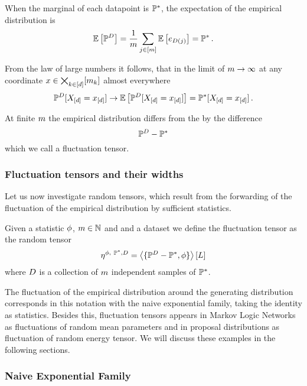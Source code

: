 When the marginal of each datapoint is $\mathbb{P}^*$, the expectation of the empirical distribution is
\begin{align*}
	\mathbb{E}\left[\mathbb{P}^{D}\right] 
	= \frac{1}{m} \sum_{j\in[m]}  \mathbb{E}\left[e_{D(j)}\right]
	= \mathbb{P}^* \, . 
\end{align*}

From the law of large numbers it follows, that in the limit of $m\rightarrow\infty$ at any coordinate $x\in\bigtimes_{k\in[d]}[m_{k}]$ almost everywhere
	\[ \mathbb{P}^{D}[X_{[d]}=x_{[d]}] \rightarrow \mathbb{E}\left[\mathbb{P}^{D}[X_{[d]}=x_{[d]}]\right] =  \mathbb{P}^*[X_{[d]}=x_{[d]}] \, . \]

At finite $m$ the empirical distribution differs from the by the difference
	\[ \mathbb{P}^{D} - \mathbb{P}^* \]
which we call a fluctuation tensor.


\subsubsection{Fluctuation tensors and their widths}

Let us now investigate random tensors, which result from the forwarding of the fluctuation of the empirical distribution by sufficient statistics.

\begin{definition}
	Given a statistic $\phi$, $m\in\mathbb{N}$ and and a dataset we define the fluctuation tensor as the random tensor
		\[ \expfamfluctuation = \contractionof{\{\empdistribution-\gendistribution,\sstat\}}{\selvariable} \]
	where $D$ is a collection of $m$ independent samples of $\mathbb{P}^*$.
\end{definition}

The fluctuation of the empirical distribution around the generating distribution corresponds in this notation with the naive exponential family, taking the identity as statistics.
Besides this, fluctuation tensors appears in Markov Logic Networks as fluctuations of random mean parameters and in proposal distributions as fluctuation of random energy tensor.
We will discuss these examples in the following sections.


\subsubsection{Naive Exponential Family}

